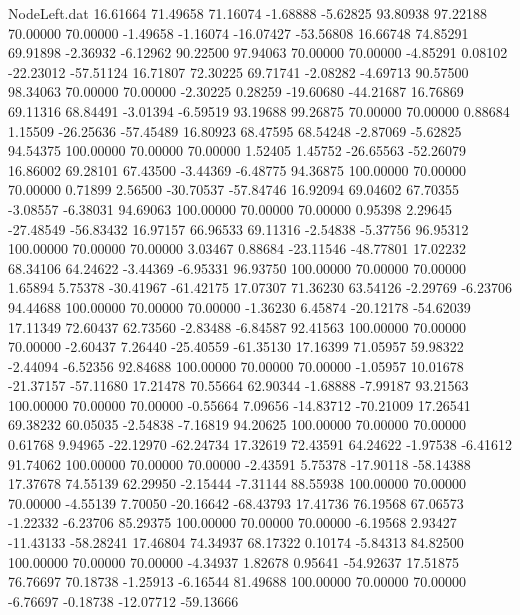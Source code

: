 \begin{filecontents}{NodeLeft.dat}
  16.61664   71.49658   71.16074    -1.68888   -5.62825   93.80938   97.22188   70.00000   70.00000   -1.49658   -1.16074  -16.07427  -53.56808
  16.66748   74.85291   69.91898    -2.36932   -6.12962   90.22500   97.94063   70.00000   70.00000   -4.85291    0.08102  -22.23012  -57.51124
  16.71807   72.30225   69.71741    -2.08282   -4.69713   90.57500   98.34063   70.00000   70.00000   -2.30225    0.28259  -19.60680  -44.21687
  16.76869   69.11316   68.84491    -3.01394   -6.59519   93.19688   99.26875   70.00000   70.00000    0.88684    1.15509  -26.25636  -57.45489
  16.80923   68.47595   68.54248    -2.87069   -5.62825   94.54375  100.00000   70.00000   70.00000    1.52405    1.45752  -26.65563  -52.26079
  16.86002   69.28101   67.43500    -3.44369   -6.48775   94.36875  100.00000   70.00000   70.00000    0.71899    2.56500  -30.70537  -57.84746
  16.92094   69.04602   67.70355    -3.08557   -6.38031   94.69063  100.00000   70.00000   70.00000    0.95398    2.29645  -27.48549  -56.83432
  16.97157   66.96533   69.11316    -2.54838   -5.37756   96.95312  100.00000   70.00000   70.00000    3.03467    0.88684  -23.11546  -48.77801
  17.02232   68.34106   64.24622    -3.44369   -6.95331   96.93750  100.00000   70.00000   70.00000    1.65894    5.75378  -30.41967  -61.42175
  17.07307   71.36230   63.54126    -2.29769   -6.23706   94.44688  100.00000   70.00000   70.00000   -1.36230    6.45874  -20.12178  -54.62039
  17.11349   72.60437   62.73560    -2.83488   -6.84587   92.41563  100.00000   70.00000   70.00000   -2.60437    7.26440  -25.40559  -61.35130
  17.16399   71.05957   59.98322    -2.44094   -6.52356   92.84688  100.00000   70.00000   70.00000   -1.05957   10.01678  -21.37157  -57.11680
  17.21478   70.55664   62.90344    -1.68888   -7.99187   93.21563  100.00000   70.00000   70.00000   -0.55664    7.09656  -14.83712  -70.21009
  17.26541   69.38232   60.05035    -2.54838   -7.16819   94.20625  100.00000   70.00000   70.00000    0.61768    9.94965  -22.12970  -62.24734
  17.32619   72.43591   64.24622    -1.97538   -6.41612   91.74062  100.00000   70.00000   70.00000   -2.43591    5.75378  -17.90118  -58.14388
  17.37678   74.55139   62.29950    -2.15444   -7.31144   88.55938  100.00000   70.00000   70.00000   -4.55139    7.70050  -20.16642  -68.43793
  17.41736   76.19568   67.06573    -1.22332   -6.23706   85.29375  100.00000   70.00000   70.00000   -6.19568    2.93427  -11.43133  -58.28241
  17.46804   74.34937   68.17322     0.10174   -5.84313   84.82500  100.00000   70.00000   70.00000   -4.34937    1.82678    0.95641  -54.92637
  17.51875   76.76697   70.18738    -1.25913   -6.16544   81.49688  100.00000   70.00000   70.00000   -6.76697   -0.18738  -12.07712  -59.13666

\end{filecontents}
